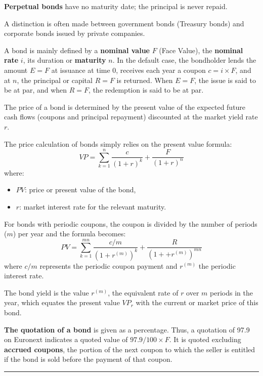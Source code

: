\begin{f}
\textbf{Perpetual bonds} have no maturity date; the principal is never repaid.
 
A distinction is often made between government bonds (Treasury bonds) and
 corporate bonds issued by private companies.



A bond is mainly defined by a \textbf{nominal value} $F$ (Face Value), the \textbf{nominal rate} $i$, its duration or \textbf{maturity} $n$.
In the default case, the bondholder lends the amount $E=F$ at issuance at time 0, receives each year a coupon $c = i \times F$, and at $n$, the principal or capital $R=F$ is returned.
When $E=F$, the issue is said to be at par, and when $R=F$, the redemption is said to be at par.


The price of a bond is determined by the present value of the expected future cash flows (coupons and principal repayment) discounted at the market yield rate $r$.
 
The price calculation of bonds simply relies on the present value formula:
\[
VP = \sum_{k=1}^{n} \frac{c}{(1 + r)^k} + \frac{F}{(1 + r)^n}
 \]
where:
\begin{itemize}
    \item $PV$: price or present value of the bond,
	\item $r$: market interest rate for the relevant maturity.
\end{itemize}


For bonds with periodic coupons, the coupon is divided by the number of periods ($m$) per year and the formula becomes:
\[ 
PV = \sum_{k=1}^{mn} \frac{c/m}{(1 + r^{(m)})^k} + \frac{R}{(1 + + r^{(m)})^{mn}}
 \]
where $c/m$ represents the periodic coupon payment and $r^{(m)}$ the periodic interest rate.

The bond yield is the value $r^{(m)}$, the equivalent rate of $r$ over $m$ periods in the year, which equates the present value $VP_r$ with the current or market price of this bond.

\textbf{The quotation of a bond} is given as a percentage. Thus, a quotation of 97.9 on Euronext indicates a quoted value of $97.9 / 100 \times F$.  
It is quoted excluding \textbf{accrued coupons}, the portion of the next coupon to which the seller is entitled if the bond is sold before the payment of that coupon.
\end{f}
\hrule


